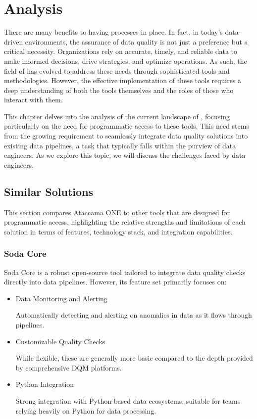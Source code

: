 \chapter{Analysis}
\label{chap:analysis}

There are many benefits to having  processes in place. In fact, in today's data-driven environments, the assurance of data quality is not just a preference but a critical necessity. Organizations rely on accurate, timely, and reliable data to make informed decisions, drive strategies, and optimize operations. As such, the field of  has evolved to address these needs through sophisticated tools and methodologies. However, the effective implementation of these tools requires a deep understanding of both the tools themselves and the roles of those who interact with them.

This chapter delves into the analysis of the current landscape of , focusing particularly on the need for programmatic access to these tools. This need stems from the growing requirement to seamlessly integrate data quality solutions into existing data pipelines, a task that typically falls within the purview of data engineers. As we explore this topic, we will discuss the challenges faced by data engineers. 

\section{Similar Solutions}

This section compares Ataccama ONE to other  tools that are designed for programmatic access, highlighting the relative strengths and limitations of each solution in terms of features, technology stack, and integration capabilities.

\subsection{Soda Core}

Soda Core \cite{sodacore} is a robust open-source tool tailored to integrate data quality checks directly into data pipelines. However, its feature set primarily focuses on:

\begin{itemize}
    \item Data Monitoring and Alerting
    
    Automatically detecting and alerting on anomalies in data as it flows through pipelines.

    \item Customizable Quality Checks

    While flexible, these are generally more basic compared to the depth provided by comprehensive DQM platforms.

    \item Python Integration
    
    Strong integration with Python-based data ecosystems, suitable for teams relying heavily on Python for data processing.
\end{itemize}

